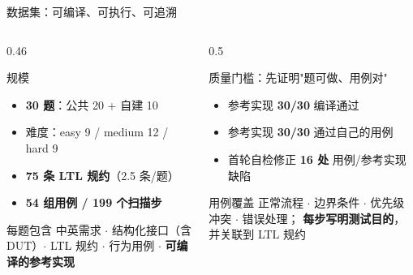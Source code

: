 \documentclass[10pt,aspectratio=169]{beamer}
\begin{document}
\begin{frame}{数据集：可编译、可执行、可追溯}
	\begin{columns}[T]
		\begin{column}{0.46\textwidth}
			\begin{block}{规模}
				\begin{itemize}
					\item \textbf{30 题}：公共 20 + 自建 10
					\item 难度：easy 9 / medium 12 / hard 9
					\item \textbf{75 条 LTL 规约}（2.5 条/题）
					\item \textbf{54 组用例 / 199 个扫描步}
				\end{itemize}
			\end{block}
			\begin{block}{每题包含}
				中英需求 $\cdot$ 结构化接口（含 DUT）$\cdot$
				LTL 规约 $\cdot$ 行为用例 $\cdot$
				\textbf{可编译的参考实现}
			\end{block}
		\end{column}
		\begin{column}{0.5\textwidth}
			\begin{exampleblock}{质量门槛：先证明"题可做、用例对"}
				\begin{itemize}
					\item 参考实现 \textbf{30/30} 编译通过
					\item 参考实现 \textbf{30/30} 通过自己的用例
					\item 首轮自检修正 \textbf{16 处}
					      用例/参考实现缺陷
				\end{itemize}
			\end{exampleblock}
			\begin{block}{用例覆盖}
				正常流程 $\cdot$ 边界条件 $\cdot$
				优先级冲突 $\cdot$ 错误处理；
				\textbf{每步写明测试目的}，并关联到 LTL 规约
			\end{block}
		\end{column}
	\end{columns}
\end{frame}
\end{document}
